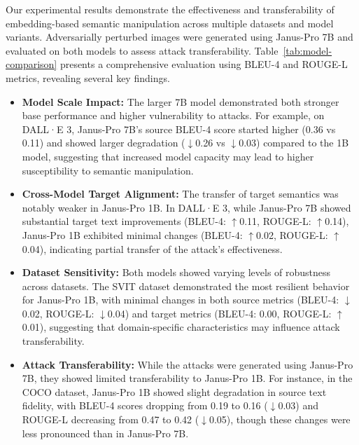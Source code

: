 \documentclass[runningheads]{llncs}
\begin{document}
Our experimental results demonstrate the effectiveness and transferability of embedding-based semantic manipulation across multiple datasets and model variants. Adversarially perturbed images were generated using Janus-Pro 7B and evaluated on both models to assess attack transferability. Table~\ref{tab:model-comparison} presents a comprehensive evaluation using BLEU-4 \cite{papineni2002bleu} and ROUGE-L \cite{lin2004rouge} metrics, revealing several key findings. 

\begin{itemize}


        
    \item \textbf{Model Scale Impact:} The larger 7B model demonstrated both stronger base performance and higher vulnerability to attacks. For example, on DALL·E 3, Janus-Pro 7B's source BLEU-4 score started higher (0.36 vs 0.11) and showed larger degradation ($\downarrow$0.26 vs $\downarrow$0.03) compared to the 1B model, suggesting that increased model capacity may lead to higher susceptibility to semantic manipulation.
    
    \item \textbf{Cross-Model Target Alignment:} The transfer of target semantics was notably weaker in Janus-Pro 1B. In DALL·E 3, while Janus-Pro 7B showed substantial target text improvements (BLEU-4: $\uparrow$0.11, ROUGE-L: $\uparrow$0.14), Janus-Pro 1B exhibited minimal changes (BLEU-4: $\uparrow$0.02, ROUGE-L: $\uparrow$0.04), indicating partial transfer of the attack's effectiveness.
    
    \item \textbf{Dataset Sensitivity:} Both models showed varying levels of robustness across datasets. The SVIT dataset demonstrated the most resilient behavior for Janus-Pro 1B, with minimal changes in both source metrics (BLEU-4: $\downarrow$0.02, ROUGE-L: $\downarrow$0.04) and target metrics (BLEU-4: 0.00, ROUGE-L: $\uparrow$0.01), suggesting that domain-specific characteristics may influence attack transferability.

    \item \textbf{Attack Transferability:} While the attacks were generated using Janus-Pro 7B, they showed limited transferability to Janus-Pro 1B. For instance, in the COCO dataset, Janus-Pro 1B showed slight degradation in source text fidelity, with BLEU-4 scores dropping from 0.19 to 0.16 ($\downarrow$0.03) and ROUGE-L decreasing from 0.47 to 0.42 ($\downarrow$0.05), though these changes were less pronounced than in Janus-Pro 7B.


\end{itemize}
\end{document}
